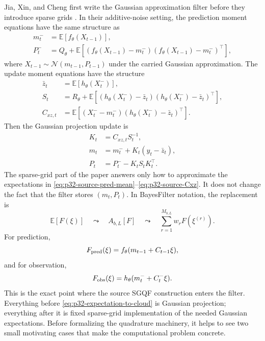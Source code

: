 \documentclass[11pt]{article}
\numberwithin{equation}{section}
\newcommand{\E}{\mathbb E}
\newcommand{\N}{\mathcal N}
\begin{document}
Jia, Xin, and Cheng first write the Gaussian approximation filter before they
introduce sparse grids \cite[Section 2.2]{jia2012sparsegrid}.  In their
additive-noise setting, the prediction moment equations have the same
structure as
\begin{align}
  m_t^-&=\E[f_\theta(X_{t-1})],
  \label{eq:p32-source-pred-mean}\\
  P_t^-&=
  Q_\theta+
  \E[(f_\theta(X_{t-1})-m_t^-)(f_\theta(X_{t-1})-m_t^-)^\top],
  \label{eq:p32-source-pred-cov}
\end{align}
where \(X_{t-1}\sim\N(m_{t-1},P_{t-1})\) under the carried Gaussian
approximation.  The update moment equations have the structure
\begin{align}
  \bar z_t&=\E[h_\theta(X_t^-)],
  \label{eq:p32-source-zbar}\\
  S_t&=
  R_\theta+
  \E[(h_\theta(X_t^-)-\bar z_t)(h_\theta(X_t^-)-\bar z_t)^\top],
  \label{eq:p32-source-S}\\
  C_{xz,t}&=
  \E[(X_t^- -m_t^-)(h_\theta(X_t^-)-\bar z_t)^\top].
  \label{eq:p32-source-Cxz}
\end{align}
Then the Gaussian projection update is
\begin{align}
  K_t&=C_{xz,t}S_t^{-1},
  \label{eq:p32-source-K}\\
  m_t&=m_t^-+K_t(y_t-\bar z_t),
  \label{eq:p32-source-m-update}\\
  P_t&=P_t^- -K_tS_tK_t^\top.
  \label{eq:p32-source-P-update}
\end{align}
The sparse-grid part of the paper answers only how to approximate the
expectations in \eqref{eq:p32-source-pred-mean}--\eqref{eq:p32-source-Cxz}.
It does not change the fact that the filter stores
\((m_t,P_t)\).  In BayesFilter notation, the replacement is
\begin{equation}
  \E[F(\xi)]
  \quad\leadsto\quad
  A_{b,L}[F]
  \quad\leadsto\quad
  \sum_{r=1}^{M_{b,L}}w_rF(\xi^{(r)}).
  \label{eq:p32-expectation-to-cloud}
\end{equation}
For prediction,
\[
  F_{\rm pred}(\xi)=
  f_\theta(m_{t-1}+C_{t-1}\xi),
\]
and for observation,
\[
  F_{\rm obs}(\xi)=
  h_\theta(m_t^-+C_t^-\xi).
\]
This is the exact point where the source SGQF construction enters the filter.
Everything before \eqref{eq:p32-expectation-to-cloud} is Gaussian projection;
everything after it is fixed sparse-grid implementation of the needed
Gaussian expectations.  Before formalizing the quadrature machinery, it helps to
see two small motivating cases that make the computational problem concrete.
\end{document}

